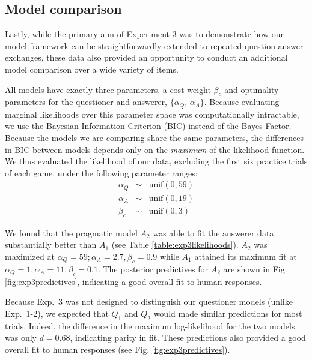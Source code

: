 \documentclass[11pt, floatsintext]{apa6}
\begin{document}
\subsection{Model comparison}

Lastly, while the primary aim of Experiment 3 was to demonstrate how our model framework can be straightforwardly extended to repeated question-answer exchanges, these data also provided an opportunity to conduct an additional model comparison over a wide variety of items.

All models have exactly three parameters, a cost weight $\beta_c$ and optimality parameters for the questioner and answerer, $\{\alpha_Q$, $\alpha_A\}$.
Because evaluating marginal likelihoods over this parameter space was computationally intractable, we use the Bayesian Information Criterion (BIC) instead of the Bayes Factor. 
Because the models we are comparing share the same parameters, the differences in BIC between models depends only on the \emph{maximum} of the likelihood function.
We thus evaluated the likelihood of our data, excluding the first six practice trials of each game, under the following parameter ranges:
$$
\begin{array}{rcl}
\alpha_Q & \sim & \textrm{unif}(0, 59) \\
\alpha_A & \sim & \textrm{unif}(0, 19) \\
\beta_c & \sim & \textrm{unif}(0, 3)
\end{array}
$$

We found that the pragmatic model $A_2$ was able to fit the answerer data substantially better than $A_1$ (see Table \ref{table:exp3likelihoods}).
$A_2$ was maximized at $\alpha_Q = 59; \alpha_A = 2.7, \beta_c = 0.9$ while $A_1$ attained its maximum fit at $\alpha_Q = 1, \alpha_A = 11, \beta_c = 0.1$. 
The posterior predictives for $A_2$ are shown in  Fig. \ref{fig:exp3predictives}, indicating a good overall fit to human responses.

Because Exp.~3 was not designed to distinguish our questioner models (unlike Exp.~1-2), we expected that $Q_1$ and $Q_2$ would made similar predictions for most trials. 
Indeed, the difference in the maximum log-likelihood for the two models was only $d=0.68$, indicating parity in fit.
These predictions also provided a good overall fit to human responses (see Fig. \ref{fig:exp3predictives}).
\end{document}
